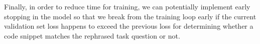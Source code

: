 \documentclass[11pt,a4paper]{article}
\begin{document}
Finally, in order to reduce time for training, we can potentially
implement early stopping in the model so that we break from the
training loop early if the current validation set loss happens to
exceed the previous loss for determining whether a code snippet
matches the rephrased task question or not.
\end{document}
